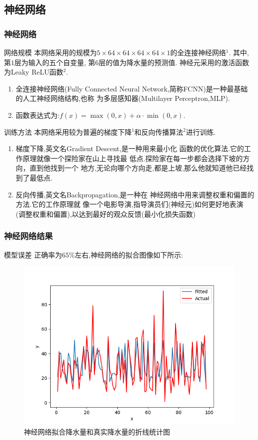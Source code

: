 \documentclass[10pt]{beamer}
\begin{document}
\subsection{神经网络}
\begin{frame}
	\frametitle{神经网络}
	\begin{block}{网络规模}
		本网络采用的规模为$5 \times 64 \times 64 \times 64 \times 64 \times 1$的全连接神经网络$^1$.
		其中, 第$1$层为输入的五个自变量, 第$6$层的值为降水量的预测值.
		神经元采用的激活函数为Leaky ReLU函数$^2$.
		\begin{enumerate}
			\item 全连接神经网络(Fully Connected Neural Network,简称FCNN)是一种最基础的人工神经网络结构,也称
			      为多层感知器(Multilayer Perceptron,MLP).
			\item 函数表达式为:\qquad$f(x)=\max(0, x) + \alpha \cdot \min(0, x)$.
		\end{enumerate}
	\end{block}
	\begin{block}{训练方法}
		本网络采用较为普遍的梯度下降$^1$和反向传播算法$^2$进行训练.
		\begin{enumerate}
			\item 梯度下降,英文名Gradient Descent,是一种用来最小化
			      函数的优化算法.它的工作原理就像一个探险家在山上寻找最
			      低点.探险家在每一步都会选择下坡的方向，直到他找到一个
			      地方,无论向哪个方向走,都是上坡,那么他就知道他已经找到了最低点.
			\item 反向传播,英文名Backpropagation,是一种在
			      神经网络中用来调整权重和偏置的方法.它的工作原理就
			      像一个电影导演,指导演员们(神经元)如何更好地表演
			      (调整权重和偏置),以达到最好的观众反馈(最小化损失函数)
		\end{enumerate}
	\end{block}
\end{frame}

\begin{frame}
	\frametitle{神经网络结果}
	\begin{block}{模型误差}
		正确率为$65\%$左右,神经网络的拟合图像如下所示:
		\begin{figure}[h!]
			\centering
			\includegraphics[scale=0.2]{../latex/success.png}
			\caption{神经网络拟合降水量和真实降水量的折线统计图}
		\end{figure}
	\end{block}
\end{frame}
\end{document}
